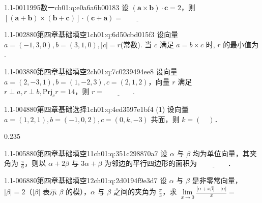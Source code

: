 \par\addvspace{2.4ex}\noindent
\begin{minipage}{\linewidth}

\begin{q}{1.1-001}{1995数一}{ch01:q:e0a6a6b00183}
设 $(\mathbf{a}\times\mathbf{b})\cdot\mathbf{c}=2$，则 $[(\mathbf{a}+\mathbf{b})\times(\mathbf{b}+\mathbf{c})]\cdot(\mathbf{c}+\mathbf{a})=\underline{\hspace{4em}}$
\end{q}
\end{minipage}


\begin{q}{1.1-002}{880第四章基础填空1}{ch01:q:6d50cbd015f3}
设向量 $a=(-1,3,0), b=(3,1,0), |c|=r$(常数). 当 $c$ 满足 $a=b\times c$ 时, $r$ 的最小值为 \underline{\hspace{4em}} .
\end{q}

\begin{q}{1.1-003}{880第四章基础填空2}{ch01:q:7c0239494ee8}
设向量 $a=(2,-3,1),b=(1,-2,3),c=(2,1,2)$，向量 $r$ 满足 $r\perp a,r\perp b,\mathrm{Prj}_{c}r=14$，则 $r=\underline{\hspace{4em}}$.
\end{q}

\begin{q}{1.1-004}{880第四章基础选择1}{ch01:q:4ed3597e1bf4}
(1) 设向量 $a=(1,2,1),b=(-1,0,2),c=(0,k,-3)$ 共面，则 $k=(\quad)$．
\begin{opts}{0.235}
\hfill{}\hfill{}\hfill{}
\end{opts}
\end{q}

\begin{q}{1.1-005}{880第四章基础填空11}{ch01:q:351c298870a7}
设 $\alpha$ 与 $\beta$ 均为单位向量，其夹角为 $\frac{\pi}{6}$，则以 $\alpha+2\beta$ 与 $3\alpha+\beta$ 为邻边的平行四边形的面积为 $\underline{\hspace{4em}}$．
\end{q}

\begin{q}{1.1-006}{880第四章基础填空12}{ch01:q:2d0194f9e3d7}
设 $\alpha$ 与 $\beta$ 是非零常向量，$|\beta|=2$（$|\beta|$ 表示 $\beta$ 的模），$\alpha$ 与 $\beta$ 之间的夹角为 $\frac{\pi}{3}$，求 $\displaystyle \lim\limits_{x\to 0}\frac{|\alpha+x\beta|-|\alpha|}{x}=$
\end{q}

